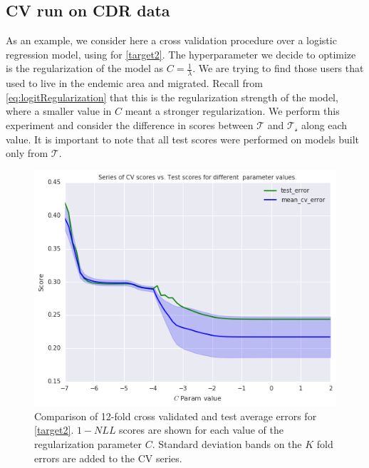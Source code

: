 \subsection{CV run on CDR data}\label{subsection:cvExperiment}

As an example, we consider here a cross validation procedure over a logistic regression model, using for \cref{target2}.
The hyperparameter we decide to optimize is the regularization of the model as $C = \frac{1}{\lambda}$. 
We are trying to find those users that used to live in the endemic area and migrated. 
Recall from \cref{eq:logitRegularization} that this is the regularization strength of the model, where a smaller value in $C$ meant a stronger regularization.
We perform this experiment and consider the difference in scores between  $\mathcal{T}$ and $\mathcal{T_s}$ along each value.
It is important to note that all test scores were performed on models built only from $\mathcal{T}$.


\begin{figure}[h!]
\begin{center}
\includegraphics[width=1.2\columnwidth]{figures/cross_validation/train_and_cv_score_comparison_logreg.jpg}
\caption{ Comparison of 12-fold cross validated and test average errors for \cref{target2}.   $1-NLL$ scores are shown for each value of the regularization parameter $C$. Standard deviation bands on the $K$ fold errors are added to the CV series.}
\label{fig:cv_vs_test_score}
\end{center}
\end{figure}

